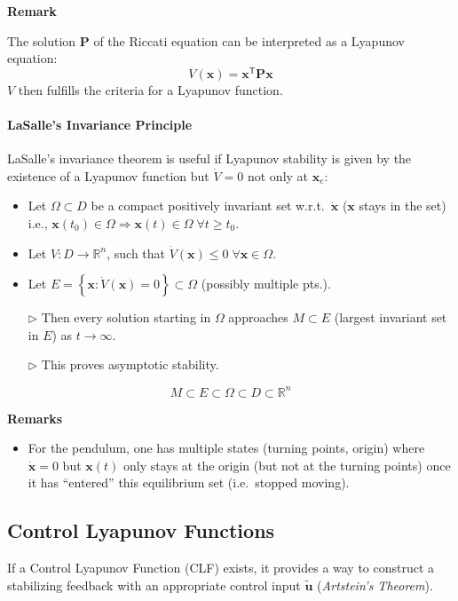 \newpar{}
\textbf{Remark}

The solution $\mathbf{P}$ of the Riccati equation can be interpreted as a Lyapunov equation:
\noindent\begin{equation*}
    V(\mathbf{x}) = \mathbf{x}^{\mathsf{T}} \mathbf{Px}
\end{equation*}
$V$ then fulfills the criteria for a Lyapunov function.

\paragraph{LaSalle's Invariance Principle}
LaSalle's invariance theorem is useful if Lyapunov stability is given by the existence of a Lyapunov function but $\dot{V}=0$ not only at $\mathbf{x}_e$:

\newpar{}
\begin{itemize}[leftmargin=14pt]
    \item Let $\Omega\subset D$ be a compact positively invariant set w.r.t.\ $\dot{\mathbf{x}}$ ($\mathbf{x}$ stays in the set) i.e., $\mathbf{x}(t_0)\in \Omega \Rightarrow \mathbf{x}(t)\in\Omega\; \forall t \geq t_0$.
    \item Let $V:D\to \mathbb{R}^n$, such that $\dot{V}(\mathbf{x})\leq 0\; \forall \mathbf{x}\in \Omega$.
    \item Let $E=\left\{\mathbf{x}: \dot{V}(\mathbf{x})=0\right\}\subset \Omega$ (possibly multiple pts.).
    \item[$\rhd$] Then every solution starting in $\Omega$ approaches $M\subset E$ (largest invariant set in $E$) as $t\to \infty$.
    \item[$\rhd$] This proves asymptotic stability.
\end{itemize}
\newpar{}
\begin{equation*}
    M\subset E \subset \Omega \subset D \subset \mathbb{R}^n
\end{equation*}

\newpar{}
\textbf{Remarks}
\begin{itemize}\item For the pendulum, one has multiple states (turning points, origin) where $\dot{\mathbf{x}}=0$ but $\mathbf{x}(t)$ only stays at the origin (but not at the turning points) once it has ``entered'' this equilibrium set (i.e.\ stopped moving).
\end{itemize}

\subsection{Control Lyapunov Functions}
If a Control Lyapunov Function (CLF) exists, it provides a way to construct a stabilizing feedback with an appropriate control input $\tilde{\mathbf{u}}$ (\textit{Artstein's Theorem}).

